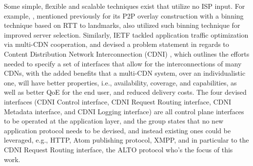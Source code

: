     Some simple, flexible and scalable techniques exist that utilize no ISP input.
    For example, \cite{topology-aware-p2p-server-selection}, mentioned previously for its P2P overlay construction with a binning technique based on RTT to landmarks, also utilized such binning technique for improved server selection.
    Similarly, IETF tackled application traffic optimization via multi-CDN cooperation, and devised a problem statement in regards to Content Distribution Network Interconnection (CDNI) \cite{cdni-problem-statement}, which outlines the efforts needed to specify a set of interfaces that allow for the interconnections of many CDNs, with the added benefits that a multi-CDN system, over an individualistic one, will have better properties, i.e., availability, coverage, and capabilities, as well as better QoE for the end user, and reduced delivery costs.
    The four devised interfaces (CDNI Control interface, CDNI Request Routing interface, CDNI Metadata interface, and CDNI Logging interface) are all control plane interfaces to be operated at the application layer, and the group states that no new application protocol needs to be devised, and instead existing ones could be leveraged, e.g., HTTP, Atom publishing protocol, XMPP, and in particular to the CDNI Request Routing interface, the ALTO protocol who's the focus of this work.

